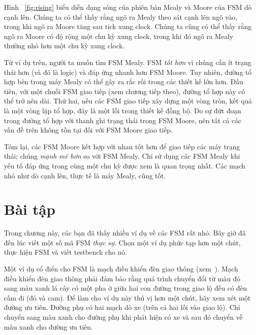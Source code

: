 \documentclass[%
    10pt,
    headinclude, footexclude,
    openright, %
    notitlepage,
    cleardoubleempty,
    headsepline,
    pointlessnumbers,
    bibtotoc, idxtotoc,
    ]{scrbook}
\newcommand{\todo}[1]{{\emph{TODO: #1}}}
\renewcommand{\todo}[1]{}
\begin{document}
Hình ~\ref{fig:rising} biểu diễn dạng sóng của phiên bản Mealy và Moore của FSM dò cạnh lên. Chúng ta có thể thấy rằng ngõ ra Mealy theo sát cạnh lên ngõ vào, trong khi ngõ ra Moore tăng sau tick xung clock. Chúng ta cũng có thể thấy rằng ngõ ra Moore có độ rộng một chu kỳ xung clock, trong khi đó ngõ ra Mealy thường nhỏ hơn một chu kỳ xung clock.

Từ ví dụ trên, người ta muốn tìm FSM Mealy. FSM \emph{tốt hơn} vì chúng cần ít trạng thái hơn (và đó là logic) và đáp ứng nhanh hơn FSM Moore. Tuy nhiên, đường tổ hợp bên trong máy Mealy có thể gây ra rắc rối trong các thiết kế lớn hơn. Đầu tiên, với một chuỗi FSM giao tiếp (xem chương tiếp theo), đường tổ hợp này có thể trở nên dài. Thứ hai, nếu các FSM giao tiếp xây dựng một vòng tròn, kết quả là một vòng lặp tổ hợp, đây là một lỗi trong thiết kế đồng bộ. Do sự đứt đoạn trong đường tổ hợp với thanh ghi trạng thái trong FSM Moore, nên tất cả các vấn đề trên không tồn tại đối với FSM Moore giao tiếp.

Tóm lại, các FSM Moore kết hợp với nhau tốt hơn để giao tiếp các máy trạng thái; chúng \emph{mạnh mẽ hơn} so với FSM Mealy. Chỉ sử dụng các FSM Mealy khi yếu tố đáp ứng trong cùng một chu kỳ được xem là quan trọng nhất. Các mạch nhỏ như dò cạnh lên, thực tế là máy Mealy, cũng tốt. 

\section{Bài tập}

Trong chương này, các bạn đã thấy nhiều ví dụ về các FSM rất nhỏ. Bây giờ đã đến lúc viết một số mã FSM \emph{thực sự}. Chọn một ví dụ phức tạp hơn một chút, thực hiện FSM và viết testbench cho nó.

Một ví dụ cổ điển cho FSM là mạch điều khiển đèn giao thông (xem~\cite[Phần~14.3]{dally:vhdl:2016}). Mạch điều khiển đèn giao thông phải đảm bảo rằng quá trình chuyển đổi từ màu đỏ sang màu xanh lá cây có một pha ở giữa hai con đường trong giao lộ đều có đèn cấm đi (đỏ và cam). Để làm cho ví dụ này thú vị hơn một chút, hãy xem xét một đường ưu tiên. Đường phụ có hai mạch dò xe (trên cả hai lối vào giao lộ). Chỉ chuyển sang màu xanh cho đường phụ khi phát hiện có xe và sau đó chuyển về màu xanh cho đường ưu tiên. 

\todo{Luca: Greatest common divisor with Euclide algorithm can be also a nice exercise.
Martin: but this is shown at the Chisel homepage without an FSM.}
\end{document}
